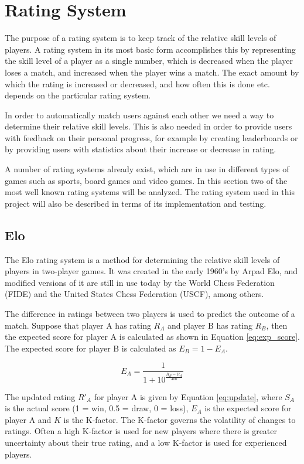 \section{Rating System}
The purpose of a rating system is to keep track of the relative skill levels of players.
A rating system in its most basic form accomplishes this by representing the skill level of a player as a single number, which is decreased when the player loses a match, and increased when the player wins a match.
The exact amount by which the rating is increased or decreased, and how often this is done etc. depends on the particular rating system.

In order to automatically match users against each other we need a way to determine their relative skill levels.
This is also needed in order to provide users with feedback on their personal progress, for example by creating leaderboards or by providing users with statistics about their increase or decrease in rating.

A number of rating systems already exist, which are in use in different types of games such as sports, board games and video games.
In this section two of the most well known rating systems will be analyzed.
The rating system used in this project will also be described in terms of its implementation and testing.

\subsection{Elo}
\label{sec:elo}
The Elo rating system is a method for determining the relative skill levels of players in two-player games.
It was created in the early 1960's by Arpad Elo, and modified versions of it are still in use today by the World Chess Federation (FIDE) and the United States Chess Federation (USCF), among others.

The difference in ratings between two players is used to predict the outcome of a match.
Suppose that player A has rating $R_A$ and player B has rating $R_B$, then the expected score for player A is calculated as shown in Equation \ref{eq:exp_score}.
The expected score for player B is calculated as $E_B = 1 - E_A$.

\begin{equation} \label{eq:exp_score}
E_A = \frac{1}{1 + 10^\frac{R_B - R_A}{400}}
\end{equation}

The updated rating $R'_A$ for player A is given by Equation \ref{eq:update}, where $S_A$ is the actual score (1 = win, 0.5 = draw, 0 = loss), $E_A$ is the expected score for player A and $K$ is the K-factor.
The K-factor governs the volatility of changes to ratings.
Often a high K-factor is used for new players where there is greater uncertainty about their true rating, and a low K-factor is used for experienced players.

